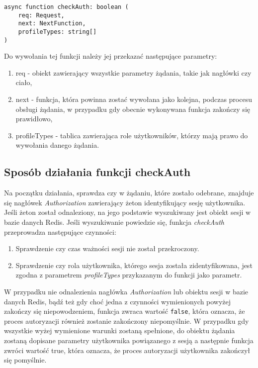 \documentclass[a4paper,12pt,twoside,openany]{report}
\begin{document}
\begin{lstlisting}[caption=Sygnatura funkcji checkAuth,label=code1,captionpos=b]
async function checkAuth: boolean (
	req: Request,
	next: NextFunction,                        
	profileTypes: string[]
)
\end{lstlisting}



Do wywołania tej funkcji należy jej przekazać następujące parametry:
\begin{enumerate}
	
	\item req - obiekt zawierający wszystkie parametry żądania, takie jak nagłówki czy ciało,
	
	\item next - funkcja, która powinna zostać wywołana jako kolejna, podczas procesu obsługi żądania, w przypadku gdy obecnie wykonywana funkcja zakończy się prawidłowo,
	
	\item profileTypes - tablica zawierająca role użytkowników, którzy mają prawo do wywołania danego żądania.
\end{enumerate}

\subsection{Sposób działania funkcji checkAuth}
Na początku działania, sprawdza czy w żądaniu, które zostało odebrane, znajduje się nagłówek \textit{Authorization} zawierający żeton identyfikujący sesję użytkownika. Jeśli żeton został odnaleziony, na jego podstawie wyszukiwany jest obiekt sesji w bazie danych Redis. Jeśli wyszukiwanie powiedzie się, funkcja \textit{checkAuth} przeprowadza następujące czynności:
\begin{enumerate}	
	\item Sprawdzenie czy czas ważności sesji nie został przekroczony.
	
	\item Sprawdzenie czy rola użytkownika, którego sesja została zidentyfikowana, jest zgodna z parametrem \textit{profileTypes} przykazanym do funkcji jako parametr.
\end{enumerate}
W przypadku nie odnalezienia nagłówka \textit{Authorization} lub obiektu sesji w bazie danych Redis, bądź też gdy choć jedna z czynności wymienionych powyżej zakończy się niepowodzeniem, funkcja zwraca wartość \verb|false|, która oznacza, że proces autoryzacji również zostanie zakończony niepomyślnie. W przypadku gdy wszystkie wyżej wymienione warunki zostaną spełnione, do obiektu żądania zostaną dopisane parametry użytkownika powiązanego z sesją a następnie funkcja zwróci wartość true, która oznacza, że proces autoryzacji użytkownika zakończył się pomyślnie.
\end{document}
